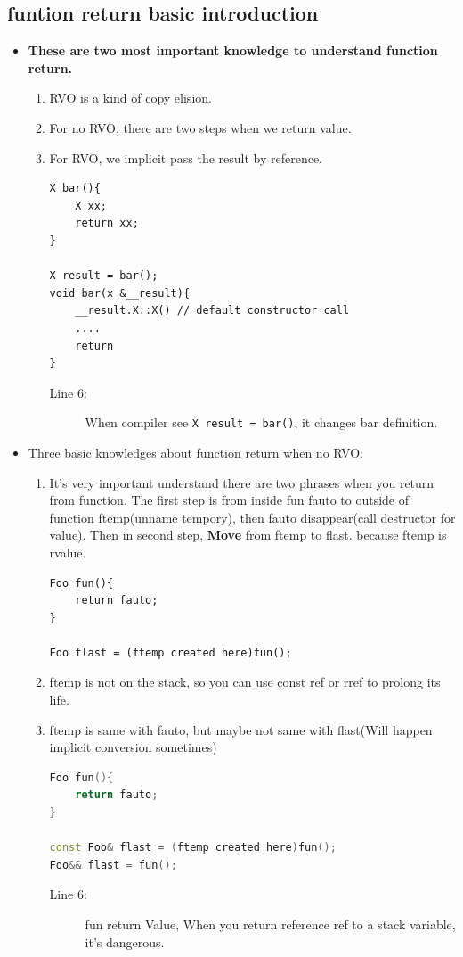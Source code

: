 \documentclass[a4paper,11pt,twoside]{book}
\begin{document}
\subsection{funtion return basic introduction}
\begin{itemize}
	\item \textbf{These are two most important knowledge to understand function return.}
	\begin{enumerate}
		\item RVO is a kind of copy elision.
		\item For no RVO, there are two steps when we return value.
		\item For RVO, we implicit pass the result by reference.
\begin{lstlisting}
X bar(){
	X xx;
	return xx;
}
	
X result = bar();
void bar(x &__result){
	__result.X::X() // default constructor call
	....
	return
}
\end{lstlisting}
\begin{description}
	\item[Line 6:] When compiler see \texttt{X result = bar()}, it changes bar definition.  
\end{description}

	\end{enumerate}
	
	\item Three basic knowledges about function return when no RVO:
	\begin{enumerate}
		\item It's very important understand there are two phrases when you return from function. The first step  is from inside fun fauto to outside of function ftemp(unname tempory), then fauto disappear(call destructor for value).  Then in second step, \textbf{Move} from ftemp to flast. because ftemp is rvalue.
\begin{lstlisting}[numbers=none]
Foo fun(){
	return fauto;
}
		
Foo flast = (ftemp created here)fun();
\end{lstlisting}
		\item ftemp is not on the stack, so you can use const ref or rref to prolong its life.
		
		\item ftemp is same with fauto, but maybe not same with flast(Will happen implicit conversion sometimes)
\begin{lstlisting}[frame=single, language=c++]
Foo fun(){
	return fauto;
}
		
const Foo& flast = (ftemp created here)fun();
Foo&& flast = fun();
\end{lstlisting}
\begin{description}
	\item[Line 6:] fun return Value, When you return reference ref to a stack variable, it's dangerous.
\end{description}

	\end{enumerate}
	
	\end{itemize}
\end{document}
